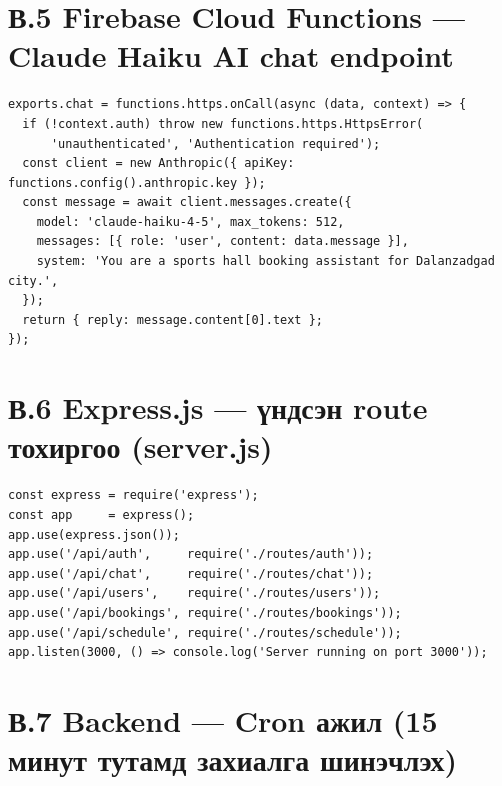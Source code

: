 
\section*{В.5 Firebase Cloud Functions --- Claude Haiku AI chat endpoint}

\begin{lstlisting}[language={}, caption={functions/index.js --- Anthropic Claude Haiku-тай холбогдох onCall функц}, label={lst:claude}]
exports.chat = functions.https.onCall(async (data, context) => {
  if (!context.auth) throw new functions.https.HttpsError(
      'unauthenticated', 'Authentication required');
  const client = new Anthropic({ apiKey: functions.config().anthropic.key });
  const message = await client.messages.create({
    model: 'claude-haiku-4-5', max_tokens: 512,
    messages: [{ role: 'user', content: data.message }],
    system: 'You are a sports hall booking assistant for Dalanzadgad city.',
  });
  return { reply: message.content[0].text };
});
\end{lstlisting}


\section*{В.6 Express.js --- үндсэн route тохиргоо (server.js)}

\begin{lstlisting}[language={}, caption={backend/server.js --- Express middleware ба route модулиуд}, label={lst:server}]
const express = require('express');
const app     = express();
app.use(express.json());
app.use('/api/auth',     require('./routes/auth'));
app.use('/api/chat',     require('./routes/chat'));
app.use('/api/users',    require('./routes/users'));
app.use('/api/bookings', require('./routes/bookings'));
app.use('/api/schedule', require('./routes/schedule'));
app.listen(3000, () => console.log('Server running on port 3000'));
\end{lstlisting}


\section*{В.7 Backend --- Cron ажил (15 минут тутамд захиалга шинэчлэх)}

